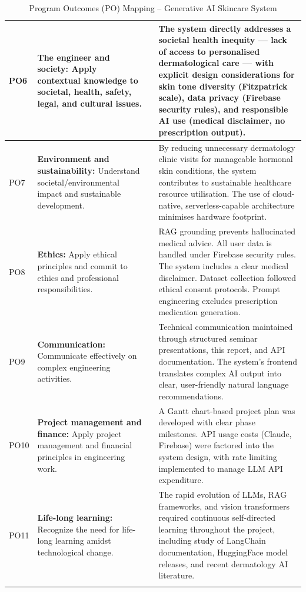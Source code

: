{\begin{longtable}{|>{\centering}p{1.5cm}|p{5cm}|>{\centering}p{1.2cm}|p{5cm}|}
PO6 & \textbf{The engineer and society:} Apply contextual knowledge to societal, health, safety, legal, and cultural issues. & 3 & The system directly addresses a societal health inequity — lack of access to personalised dermatological care — with explicit design considerations for skin tone diversity (Fitzpatrick scale), data privacy (Firebase security rules), and responsible AI use (medical disclaimer, no prescription output). \\ \hline
PO7 & \textbf{Environment and sustainability:} Understand societal/environmental impact and sustainable development. & 2 & By reducing unnecessary dermatology clinic visits for manageable hormonal skin conditions, the system contributes to sustainable healthcare resource utilisation. The use of cloud-native, serverless-capable architecture minimises hardware footprint. \\ \hline
PO8 & \textbf{Ethics:} Apply ethical principles and commit to ethics and professional responsibilities. & 3 & RAG grounding prevents hallucinated medical advice. All user data is handled under Firebase security rules. The system includes a clear medical disclaimer. Dataset collection followed ethical consent protocols. Prompt engineering excludes prescription medication generation. \\ \hline

PO9 & \textbf{Communication:} Communicate effectively on complex engineering activities. & 3 & Technical communication maintained through structured seminar presentations, this report, and API documentation. The system's frontend translates complex AI output into clear, user-friendly natural language recommendations. \\ \hline
PO10 & \textbf{Project management and finance:} Apply project management and financial principles in engineering work. & 2 & A Gantt chart-based project plan was developed with clear phase milestones. API usage costs (Claude, Firebase) were factored into the system design, with rate limiting implemented to manage LLM API expenditure. \\ \hline
PO11 & \textbf{Life-long learning:} Recognize the need for life-long learning amidst technological change. & 3 & The rapid evolution of LLMs, RAG frameworks, and vision transformers required continuous self-directed learning throughout the project, including study of LangChain documentation, HuggingFace model releases, and recent dermatology AI literature. \\ \hline
\caption{Program Outcomes (PO) Mapping -- Generative AI Skincare System}
\label{tab:PO_Mapping}
\end{longtable}
}
\newpage
\vspace{0.5in}

